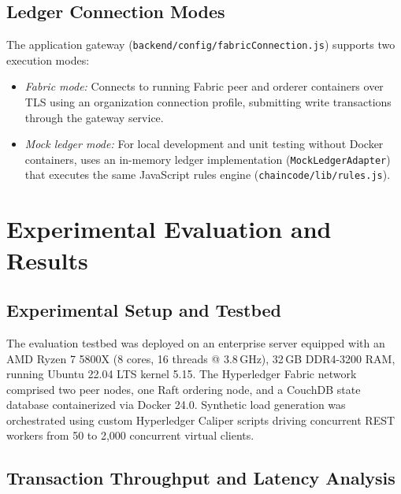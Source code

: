 \documentclass[conference]{IEEEtran}
\begin{document}
\subsection{Ledger Connection Modes}
The application gateway (\texttt{backend/config/fabricConnection.js}) supports two execution modes:
\begin{itemize}
    \item \emph{Fabric mode:} Connects to running Fabric peer and orderer containers over TLS using an organization connection profile, submitting write transactions through the gateway service.
    \item \emph{Mock ledger mode:} For local development and unit testing without Docker containers, uses an in-memory ledger implementation (\texttt{MockLedgerAdapter}) that executes the same JavaScript rules engine (\texttt{chaincode/lib/rules.js}).
\end{itemize}

\section{Experimental Evaluation and Results}

\subsection{Experimental Setup and Testbed}
The evaluation testbed was deployed on an enterprise server equipped with an AMD Ryzen 7 5800X (8 cores, 16 threads @ 3.8\,GHz), 32\,GB DDR4-3200 RAM, running Ubuntu 22.04 LTS kernel 5.15. The Hyperledger Fabric network comprised two peer nodes, one Raft ordering node, and a CouchDB state database containerized via Docker 24.0. Synthetic load generation was orchestrated using custom Hyperledger Caliper scripts driving concurrent REST workers from 50 to 2,000 concurrent virtual clients.

\subsection{Transaction Throughput and Latency Analysis}
\end{document}
